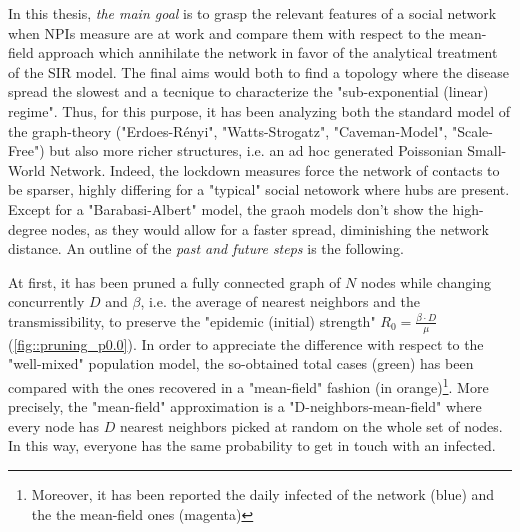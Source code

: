 \documentclass[11pt, a4paper, twoside]{article}
\begin{document}
In this thesis, \textit{the main goal} is to grasp the relevant features of a social network when NPIs measure are at work and compare them with respect to the mean-field approach which annihilate the network in favor of the analytical treatment of the SIR model. The final aims would both to find a topology where the disease spread the slowest and a tecnique to characterize the "sub-exponential (linear) regime". Thus, for this purpose, it has been analyzing both the standard model of the graph-theory ("Erdoes-Rényi", "Watts-Strogatz", "Caveman-Model", "Scale-Free") but also more richer structures, i.e. an ad hoc generated Poissonian Small-World Network. Indeed, the lockdown measures force the network of contacts to be sparser, highly differing for a "typical" social netowork where hubs are present. Except for a "Barabasi-Albert" model, the graoh models don't show the high-degree nodes, as they would allow for a faster spread, diminishing the network distance. 
\newpage
An outline of the \textit{past and future steps} is the following.

At first, it has been pruned a fully connected graph of $N$ nodes while changing concurrently $D$ and $\beta$, i.e. the average of nearest neighbors and the transmissibility, to preserve the "epidemic (initial) strength" $R_0 = \frac{\beta \cdot D}{\mu}$ (\autoref{fig::pruning_p0.0}).
In order to appreciate the difference with respect to the "well-mixed" population model, the so-obtained total cases (green) has been compared with the ones recovered in a "mean-field" fashion (in orange)\footnote{Moreover, it has been reported the daily infected of the network (blue) and the the mean-field ones (magenta)}. More precisely, the "mean-field" approximation is a "D-neighbors-mean-field" where every node has $D$ nearest neighbors picked at random on the whole set of nodes. In this way, everyone has the same probability to get in touch with an infected.
\end{document}
